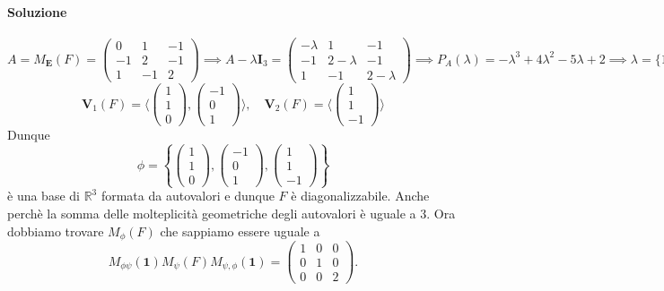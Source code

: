 \documentclass{article}
\theoremstyle{plain}
\theoremstyle{definition}
\theoremstyle{remark}
\begin{document}
\paragraph{Soluzione}
\[A=M_{\mathbf{E}}(F)=\begin{pmatrix}
    0&1&-1\\
    -1&2&-1\\
    1&-1&2
\end{pmatrix}\implies A-\lambda\mathbf{I}_3=\begin{pmatrix}
    -\lambda&1&-1\\
    -1&2-\lambda&-1\\
    1&-1&2-\lambda
\end{pmatrix}\implies P_A(\lambda)=-\lambda^3+4\lambda^2-5\lambda+2\implies\lambda=\{1,2\}\]
\[\mathbf{V}_1(F)=\langle\begin{pmatrix}1\\1\\0\end{pmatrix},\begin{pmatrix}-1\\0\\1\end{pmatrix}\rangle,\quad\mathbf{V}_2(F)=\langle\begin{pmatrix}1\\1\\-1\end{pmatrix}\rangle\]
Dunque
\[\phi=\left\{\begin{pmatrix}1\\1\\0\end{pmatrix},\begin{pmatrix}-1\\0\\1\end{pmatrix},\begin{pmatrix}1\\1\\-1\end{pmatrix}\right\}\]
è una base di $\mathbb{R}^3$ formata da autovalori e dunque $F$ è diagonalizzabile. Anche perchè la somma delle molteplicità geometriche degli autovalori è uguale a $3$.
Ora dobbiamo trovare $M_\phi(F)$ che sappiamo essere uguale a 
\[M_{\phi\psi}(\mathbf{1})M_\psi(F)M_{\psi,\phi}(\mathbf{1})=\begin{pmatrix}
    1&0&0\\
    0&1&0\\
    0&0&2
\end{pmatrix}.\]
\end{document}
